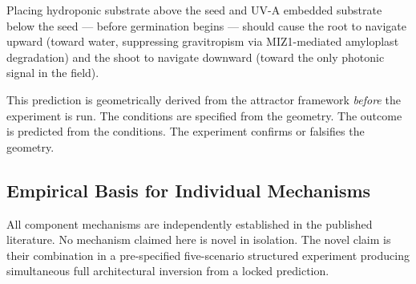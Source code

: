 \documentclass[10pt, a4paper]{article}
\begin{document}
Placing hydroponic substrate above the seed and UV-A
embedded substrate below the seed --- before germination
begins --- should cause the root to navigate upward
(toward water, suppressing gravitropism via MIZ1-mediated
amyloplast degradation) and the shoot to navigate downward
(toward the only photonic signal in the field).

This prediction is geometrically derived from the attractor
framework \textit{before} the experiment is run.
The conditions are specified from the geometry.
The outcome is predicted from the conditions.
The experiment confirms or falsifies the geometry.

\subsection{Empirical Basis for Individual Mechanisms}

All component mechanisms are independently established
in the published literature.
No mechanism claimed here is novel in isolation.
The novel claim is their combination in a pre-specified
five-scenario structured experiment producing simultaneous
full architectural inversion from a locked prediction.
\end{document}
